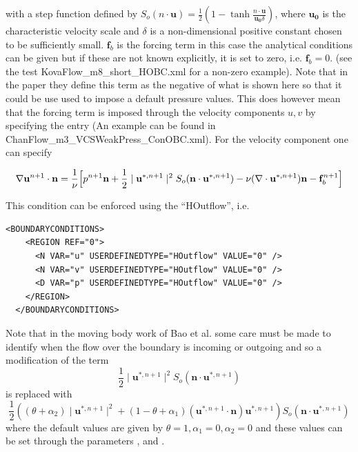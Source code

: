with a step function defined by $S_o(n\cdot
\mathbf{u})=\frac{1}{2}(1-\tanh\frac{n\cdot\mathbf{u}}{\mathbf{u_0}\delta})$,
where $\mathbf{u_0}$ is the characteristic velocity scale and $\delta$
is a non-dimensional positive constant chosen to be sufficiently
small. $\mathbf{f}_b$ is the forcing term in this case the analytical
conditions can be given but if these are not known explicitly, it is
set to zero, i.e. $\mathbf{f}_b=0$. (see the test
KovaFlow\_m8\_short\_HOBC.xml for a non-zero example). Note that in
the paper \cite{DoKa14} they define this term as the negative of what
is shown here so that it could be use used to impose a default
pressure values. This does however mean that the forcing term is
imposed through the velocity components $u,v$ by specifying the entry
 (An example can be found in
ChanFlow\_m3\_VCSWeakPress\_ConOBC.xml). For the velocity component
one can specify

 \begin{equation}
 \nabla\mathbf{u}^{n+1}\cdot\mathbf{n}=\frac{1}{\nu}\Bigl[p^{n+1}\mathbf{n}+\frac{1}{2}
   \mid \mathbf{u}^{*,n+1} \mid^2 S_o(\mathbf{n}\cdot
   \mathbf{u}^{*,n+1})-\nu(\nabla\cdot\mathbf{u}^{*,n+1})\mathbf{n}-\mathbf{f}_b^{n+1}\Bigr]
 \end{equation}

This condition can be enforced using the  ``HOutflow'', i.e. 
\begin{lstlisting}[style=XMLStyle]
  <BOUNDARYCONDITIONS>
    <REGION REF="0">
      <N VAR="u" USERDEFINEDTYPE="HOutflow" VALUE="0" />
      <N VAR="v" USERDEFINEDTYPE="HOutflow" VALUE="0" />
      <D VAR="p" USERDEFINEDTYPE="HOutflow" VALUE="0" />
    </REGION>
  </BOUNDARYCONDITIONS>
\end{lstlisting}

Note that in the moving body work of Bao et al. \cite{BaPlGrSh16}
some care must be made to identify when the flow over the boundary is
incoming or outgoing and so a modification of the term
\[
\frac{1}{2}
   \mid \mathbf{u}^{*,n+1} \mid^2 S_o(\mathbf{n}\cdot
   \mathbf{u}^{*,n+1})
\]
is replaced with
\[
   \frac{1}{2} \left ( (\theta + \alpha_2)
   \mid \mathbf{u}^{*,n+1} \mid^2 + (1-\theta + \alpha_1) 
( \mathbf{u}^{*,n+1} \cdot \mathbf{n})  \mathbf{u}^{*,n+1} \right )
   S_o(\mathbf{n}\cdot
   \mathbf{u}^{*,n+1})
\]
where the default values are given by $\theta = 1,\alpha_1 = 0,\alpha_2 = 0$ and these values can be set through the parameters ,
 and . 


